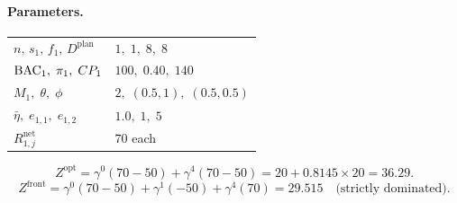 \paragraph{Parameters.}
\begin{center}
\begin{tabular}{ll}
\toprule
$n,\,s_1,\,f_1,\,D^{\mathrm{plan}}$ & $1,\;1,\;8,\;8$\\
$\mathrm{BAC}_1,\;\pi_1,\;CP_1$ & $100,\;0.40,\;140$\\
$M_1,\;\theta,\;\phi$ & $2,\;(0.5,1),\;(0.5,0.5)$\\
$\bar\eta,\;e_{1,1},\;e_{1,2}$ & $1.0,\;1,\;5$\\
$R_{1,j}^{\mathrm{net}}$ & $70$ each\\
\bottomrule
\end{tabular}
\end{center}
\[
  Z^{\mathrm{opt}} = \gamma^0(70-50)+\gamma^4(70-50)
    = 20+0.8145\times20 = \mathbf{36.29}.
\]
\[
  Z^{\mathrm{front}} = \gamma^0(70-50)+\gamma^1(-50)+\gamma^4(70)
    = 29.515\quad\text{(strictly dominated)}.
\]

